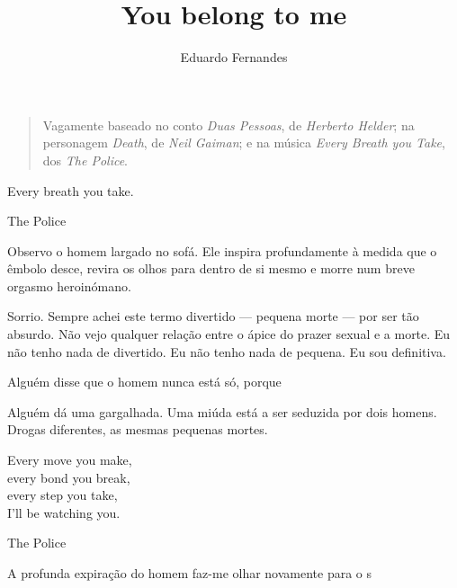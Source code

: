 \documentclass{creativeWriting}
\title{You belong to me}
\author{Eduardo Fernandes}
\begin{document}
\maketitle
\tableofcontents


\blockquote{Vagamente baseado no conto \textit{Duas Pessoas}, de \textit{Herberto Helder}; na personagem \textit{Death}, de \textit{Neil Gaiman}; e na música \textit{Every Breath you Take}, dos \textit{The Police}.}

\epigraph{Every breath you take.}{The Police}

Observo o homem largado no sofá. Ele inspira profundamente à medida que o êmbolo desce, revira os olhos para dentro de si mesmo e morre num breve orgasmo heroinómano.

Sorrio. Sempre achei este termo divertido --- pequena morte --- por ser tão absurdo. Não vejo qualquer relação entre o ápice do prazer sexual e a morte. Eu não tenho nada de divertido. Eu não tenho nada de pequena. Eu sou definitiva.

Alguém disse que o homem nunca está só, porque 

Alguém dá uma gargalhada. Uma miúda está a ser seduzida por dois homens. Drogas diferentes, as mesmas pequenas mortes.

\epigraph{Every move you make,\\every bond you break,\\every step you take,\\I'll be watching you.}{The Police}

A profunda expiração do homem faz-me olhar novamente para o s
\end{document}
